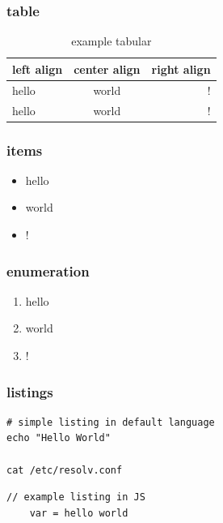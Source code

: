 \subsubsection{table}
\begin{table}[H]
    \centering
    \caption{example tabular}
    \label{tab:example tabular}
        \begin{tabular}{l | c | r}
            \hline
            left align & center align & right align\\ \hline
            \hline
            hello & world & !\\ \hline
            hello & world & !\\ \hline
        \end{tabular}
\end{table}

\subsubsection{items}
\begin{itemize}
    \item hello
    \item world
    \item !
\end{itemize}

\subsubsection{enumeration}
\begin{enumerate}
    \item hello
    \item world
    \item !
\end{enumerate}

\subsubsection{listings}
\begin{lstlisting}[caption=example listing, style=bash]
# simple listing in default language
echo "Hello World"

cat /etc/resolv.conf
\end{lstlisting}

\begin{lstlisting}[firstnumber=17, caption=example listing, style=JavaScript]
// example listing in JS
    var = hello world
\end{lstlisting}


